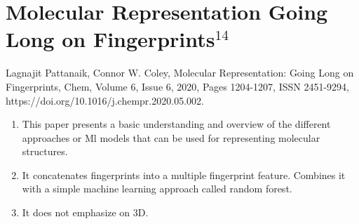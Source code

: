 \documentclass[]{report}
\begin{document}
\section{Molecular Representation Going Long on Fingerprints$^{14}$}
Lagnajit Pattanaik, Connor W. Coley,
Molecular Representation: Going Long on Fingerprints,
Chem,
Volume 6, Issue 6,
2020,
Pages 1204-1207,
ISSN 2451-9294,
https://doi.org/10.1016/j.chempr.2020.05.002.

\begin{enumerate}
	\item This paper presents a basic understanding and overview of the different approaches or Ml models that can be used for representing molecular structures.
	\item It concatenates fingerprints into a multiple fingerprint feature. Combines it with a simple machine learning approach called random forest.
	\item It does not emphasize on 3D.
\end{enumerate}
\end{document}
